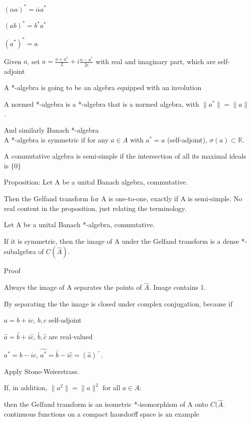 \documentclass[12pt]{article}
\begin{document}
$(\alpha a)^* = \overline{\alpha}a^*$

$(ab)^* = b^*a^*$

$(a^*)^* = a$

Given $a$, set $a = \frac{a + a^*}{2} + i \frac{a - a^*}{2i}$ with real and imaginary part, which are self-adjoint

\noindent
A *-algebra is going to be an algebra equipped with an involution

\noindent
A normed *-algebra is a *-algebra that is a normed algebra, with $\|a^*\| = \|a\|$.

\noindent
And similarly Banach *-algebra\\

\noindent
A *-algebra is symmetric if for any $a \in A$ with $a^* = a$ (self-adjoint), $\sigma(a) \subset \mathds{R}$.

\noindent
A commutative algebra is semi-simple if the intersection of all its maximal ideals is $\{0\}$

\noindent
Proposition: Let A be a unital Banach algebra, commutative.

Then the Gelfand transform for A is one-to-one, exactly if A is semi-simple.
No real content in the proposition, just relating the terminology.

\noindent
Let A be a unital Banach *-algebra, commutative.

If it is symmetric, then the image of A under the Gelfand transform is a dense *-subalgebra of $C(\hat{A})$.

\noindent
Proof

Always the image of A separates the points of $\hat{A}$.  Image contains 1.

By separating the the image is closed under complex conjugation, because if 

$a = b + ic$, $b, c$ self-adjoint

$\hat{a} = \hat{b} + i\hat{c}$, $\hat{b}, \hat{c}$ are real-valued

$a^* = b - ic$, $\hat{a^*} = \hat{b} - i\hat{c} = (\hat{a})^-.$

Apply Stone-Weierstrass.

\noindent
If, in addition, $\|a^2\| = \|a\|^2$ for all $a \in A$:

then the Gelfand transform is an isometric *-isomorphism of A onto $C(\hat{A}$.\\

\noindent
continuous functions on a compact hausdorff space is an example\\
\end{document}

